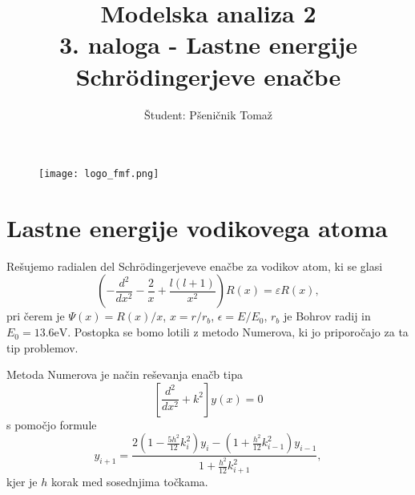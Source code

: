 \documentclass[12pt,a4paper]{article}
\title{\textbf{Modelska analiza 2} \\ 3. naloga - Lastne energije Schr\"odingerjeve enačbe \\}
\author{Študent: Pšeničnik Tomaž}
\begin{document}

	\begin{figure} [h]
  \centering
  \texttt{[image: logo\_fmf.png]}
  \maketitle
\end{figure}
	
	
	
	\newpage
	
	
	
\section*{Lastne energije vodikovega atoma}

Rešujemo radialen del Schr\"odingerjeveve enačbe  za vodikov atom, ki se glasi
\begin{equation}
\left( - \frac{d^{2}}{dx^{2}}-\frac{2}{x} +\frac{l(l+1)}{x^{2}} \right) R(x)= \varepsilon R(x),
\end{equation}
pri čerem je $\Psi(x)= R(x)/x$, $x=r/r_b$, $\epsilon = E/E_0$, $r_b$ je Bohrov radij in $E_0= 13.6 \textrm{eV}$. Postopka se bomo lotili z metodo Numerova, ki jo priporočajo za ta tip problemov.

Metoda Numerova je način reševanja enačb tipa 
\begin{equation} \label{eq:1}
\left[\frac{d^{2}}{dx^{2}}+k^{2} \right] y(x)=0
\end{equation}
s pomočjo formule
\begin{equation} \label{eq:2}
y_{i+1} = \frac{2\left(1- \frac{5h^{2}}{12}k_i ^{2}\right) y_i - \left(1 + \frac{h^{2}}{12}k_{i-1} ^{2} \right)y_{i-1}}{1+\frac{h^{2}}{12}k_{i+1}^{2}},
\end{equation}
kjer je $h$ korak med sosednjima točkama.
\end{document}
